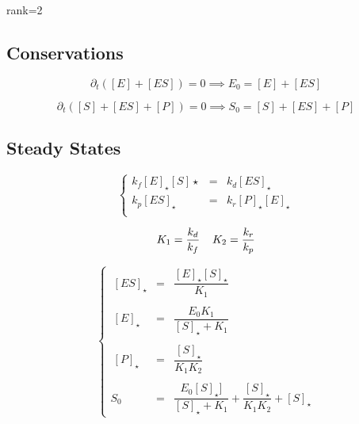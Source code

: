 \documentclass[aps,12pt]{revtex4}
\begin{document}
rank=2

\subsection{Conservations}
\begin{equation}
	\partial_t ( [E] + [ES] ) = 0 \implies E_0 = [E] + [ES]
\end{equation}

\begin{equation}
	\partial_t ( [S] + [ES] + [P]) = 0 \implies S_0 = [S] + [ES] + [P]
\end{equation}

\subsection{Steady States}

\begin{equation}
\left\lbrace
\begin{array}{rcl}
	k_f [E]_\star[S]\star & = & k_d [ES]_\star\\
	k_p [ES]_\star        & = & k_r [P]_\star[E]_\star \\
\end{array}
\right.
\end{equation}

\begin{equation}
	K_1 = \dfrac{k_d}{k_f} \;\;\;\; K_2 = \dfrac{k_r}{k_p}\\
\end{equation}

\begin{equation}
\left\lbrace
\begin{array}{rcl}
 		~[ES]_\star & = & \dfrac{[E]_\star[S]_\star}{K_1} \\
		\\
		~[E]_\star  & = & \dfrac{E_0K_1}{ [S]_\star + K_1} \\
		\\
		~[P]_\star  & = & \dfrac{[S]_\star}{K_1K_2}\\
		\\
		S_0 & = & \dfrac{E_0 [S]_\star]}{[S]_\star+K_1} + \dfrac{[S]_\star}{K_1K_2} + [S]_\star
\end{array}
\right.
\end{equation}
\end{document}
